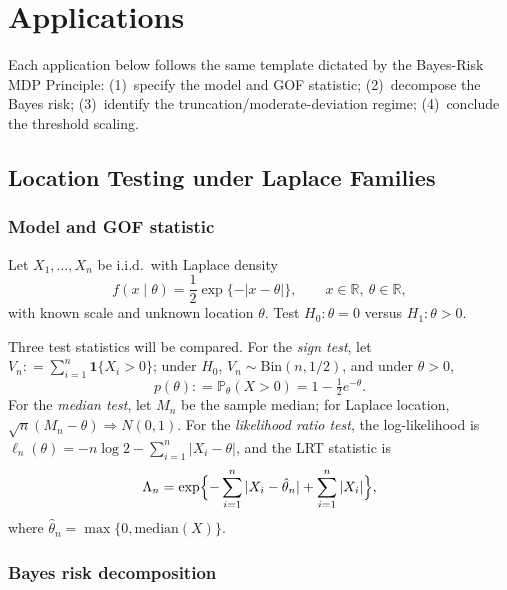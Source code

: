 \documentclass[11pt]{article}
\newcommand{\defeq}{\mathrel{\mathop:}=}
\newcommand{\R}{\mathbb{R}}
\newcommand{\1}{\mathbf{1}}
\newcommand{\PP}{\mathbb{P}}
\theoremstyle{plain}
\theoremstyle{definition}
\theoremstyle{remark}
\begin{document}
\section{Applications}
\label{sec:apps}

Each application below follows the same template dictated by the Bayes-Risk MDP Principle:
(1)~specify the model and GOF statistic;
(2)~decompose the Bayes risk;
(3)~identify the truncation/moderate-deviation regime;
(4)~conclude the threshold scaling.

\subsection{Location Testing under Laplace Families}\label{subsec:laplace}

\subsubsection{Model and GOF statistic}

Let $X_1,\ldots,X_n$ be i.i.d.\ with Laplace density
\begin{equation}\label{eq:laplace-density}
  f(x\mid\theta) = \frac12\exp\{-|x-\theta|\}, \qquad x\in\R,\ \theta\in\R,
\end{equation}
with known scale and unknown location $\theta$. Test $H_0:\theta=0$ versus $H_1:\theta>0$.

Three test statistics will be compared.
For the \emph{sign test}, let $V_n\defeq\sum_{i=1}^n\1\{X_i>0\}$; under $H_0$, $V_n\sim\mathrm{Bin}(n,1/2)$, and under $\theta>0$,
\begin{equation}\label{eq:laplace-p-pos}
  p(\theta)\defeq\PP_\theta(X>0) = 1-\tfrac12 e^{-\theta}.
\end{equation}
For the \emph{median test}, let $M_n$ be the sample median; for Laplace location, $\sqrt{n}(M_n-\theta)\Rightarrow N(0,1)$.
For the \emph{likelihood ratio test}, the log-likelihood is $\ell_n(\theta)=-n\log 2-\sum_{i=1}^n|X_i-\theta|$, and the LRT statistic is
\begin{equation}\label{eq:laplace-lrt}
  \Lambda_n = \exp\Bigl\{-\sum_{i=1}^n|X_i-\hat\theta_n|+\sum_{i=1}^n|X_i|\Bigr\},
\end{equation}
where $\hat\theta_n=\max\{0,\mathrm{median}(X)\}$.

\subsubsection{Bayes risk decomposition}
\end{document}
